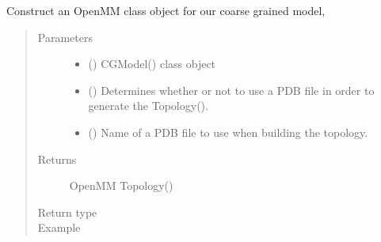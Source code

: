 \documentclass[letterpaper,12pt,english,openany,oneside]{sphinxmanual}
\begin{document}
\begin{fulllineitems}
\label{\detokenize{build:build.cg_build.build_topology}}
Construct an OpenMM  class object for our coarse grained model,
\begin{quote}\begin{description}
\item[{Parameters}] \leavevmode\begin{itemize}
\item {} 
 () \textendash{} CGModel() class object

\item {} 
 () \textendash{} Determines whether or not to use a PDB file in order to generate the Topology().

\item {} 
 () \textendash{} Name of a PDB file to use when building the topology.

\end{itemize}

\item[{Returns}] \leavevmode
OpenMM Topology()

\item[{Return type}] \leavevmode



\item[{Example}] \leavevmode
\end{description}\end{quote}


\end{fulllineitems}
\end{document}
